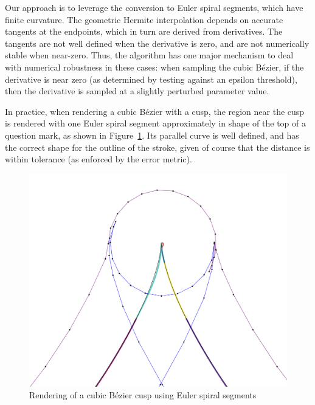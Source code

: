 \documentclass[sigconf, authordraft]{acmart}
\begin{document}
Our approach is to leverage the conversion to Euler spiral segments, which have finite curvature. The geometric Hermite interpolation depends on accurate tangents at the endpoints, which in turn are derived from derivatives. The tangents are not well defined when the derivative is zero, and are not numerically stable when near-zero. Thus, the algorithm has one major mechanism to deal with numerical robustness in these cases: when sampling the cubic Bézier, if the derivative is near zero (as determined by testing against an epsilon threshold), then the derivative is sampled at a slightly perturbed parameter value.

In practice, when rendering a cubic Bézier with a cusp, the region near the cusp is rendered with one Euler spiral segment approximately in shape of the top of a question mark, as shown in Figure~\ref{fig:cusp_rendering}. Its parallel curve is well defined, and has the correct shape for the outline of the stroke, given of course that the distance is within tolerance (as enforced by the error metric).


\begin{figure}
    \includegraphics[scale=0.24]{cusp_rendering}
    \caption{Rendering of a cubic Bézier cusp using Euler spiral segments}
    \label{fig:cusp_rendering}
\end{figure}
\end{document}
